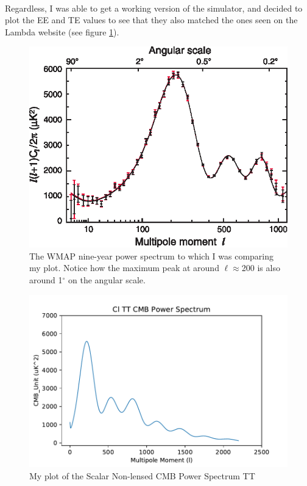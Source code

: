 \documentclass[twoside, fontsize=12pt,
     bibliography=totoc, %
     listof=totoc, %
     index=totoc, %
     onehalfspacing %
]{_MScDiss2017_cls}
\begin{document}
\paragraph{}

Regardless, I was able to get a working version of the simulator, and decided to plot the EE and TE values to see that they also matched the ones seen on the Lambda website (see figure \ref{ogcmb}).

\label{sec:template}

\begin{figure}
	\begin{center}
	\includegraphics[width=\textwidth]{gh9-f02.eps}
	\caption{The WMAP nine-year power spectrum to which I was comparing my plot. Notice how the maximum peak at around $\ell$$\approx$200 is also around 1$^\circ$ on the angular scale. \cite{LambdaTools}}
	\label{ogcmb}
	\end{center}
\end{figure}

\begin{figure}[t]
  \begin{center}
  \includegraphics{2Cl-TT-vs-l.pdf}
  \caption{My plot of the Scalar Non-lensed CMB Power Spectrum TT} 
  \label{fig:TT}
  \end{center}
\end{figure}
\end{document}
